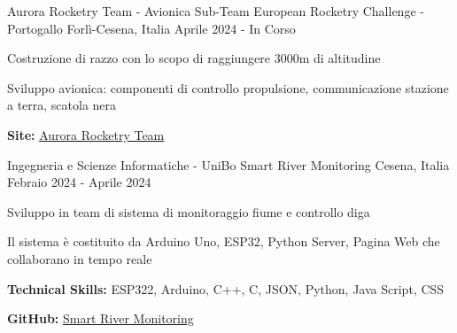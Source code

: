 

\begin{cventries}

    \cventry
    {Aurora Rocketry Team - Avionica Sub-Team} %
    {European Rocketry Challenge - Portogallo} %
    {Forlì-Cesena, Italia} %
    {Aprile 2024 - In Corso} %
    {
      \begin{cvitems} %
        \item {Costruzione di razzo con lo scopo di raggiungere 3000m di altitudine}
        \item {Sviluppo avionica: componenti di controllo propulsione, communicazione stazione a terra, scatola nera}
        \item {\textbf{Site:} \href{https://www.aurorarocketry.eu/}{Aurora Rocketry Team}}
      \end{cvitems}
    }

    \cventry
    {Ingegneria e Scienze Informatiche - UniBo} %
    {Smart River Monitoring} %
    {Cesena, Italia} %
    {Febraio 2024 - Aprile 2024} %
    {
    \begin{cvitems} %
        \item {Sviluppo in team di sistema di monitoraggio fiume e controllo diga}
        \item {Il sistema è costituito da Arduino Uno, ESP32, Python Server, Pagina Web che collaborano in tempo reale}
        \item {\textbf{Technical Skills:} ESP322, Arduino, C++, C, JSON, Python, Java Script, CSS}
        \item {\textbf{GitHub:} \href{https://github.com/elvisperlika/Smart-River-Monitoring.git}{Smart River Monitoring}}
    \end{cvitems}
    }


\end{cventries}
